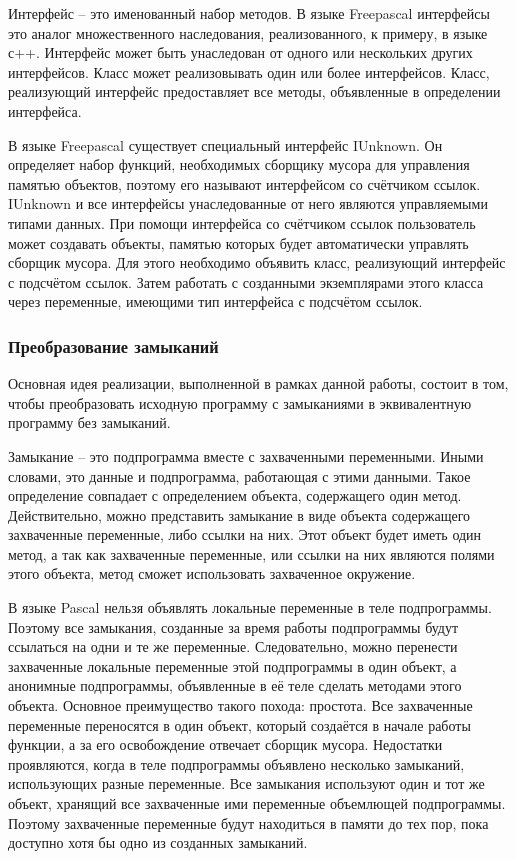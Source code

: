 \documentclass{imcs}
\begin{document}
Интерфейс -- это именованный набор методов. В языке Freepascal интерфейсы это аналог множественного
наследования, реализованного, к примеру, в языке с++. Интерфейс может быть унаследован от одного или
нескольких других интерфейсов. Класс может реализовывать один или более интерфейсов.
Класс, реализующий интерфейс предоставляет все методы, объявленные в определении интерфейса\cite{refguide}.

В языке Freepascal существует специальный интерфейс IUnknown. Он определяет
набор функций, необходимых сборщику мусора для управления памятью объектов, поэтому его называют
интерфейсом со счётчиком ссылок. IUnknown и все
интерфейсы унаследованные от него являются управляемыми типами данных.
При помощи интерфейса со счётчиком ссылок пользователь может создавать объекты,
памятью которых будет автоматически управлять сборщик мусора. Для этого необходимо
объявить класс, реализующий интерфейс с подсчётом ссылок. Затем работать с созданными
экземплярами этого класса через переменные, имеющими тип интерфейса с подсчётом ссылок.

\subsubsection{Преобразование замыканий}

Основная идея реализации, выполненной в рамках данной работы, состоит в том, чтобы преобразовать
исходную программу с замыканиями в эквивалентную программу без замыканий.

Замыкание -- это подпрограмма вместе с захваченными переменными. Иными словами, это данные и подпрограмма,
работающая с этими данными. Такое определение совпадает с определением объекта, содержащего один метод.
Действительно, можно представить замыкание в виде объекта содержащего захваченные переменные,
либо ссылки на них. Этот объект будет иметь один метод, а так как захваченные переменные, или ссылки на них
являются полями этого объекта, метод сможет использовать захваченное окружение.

В языке Pascal нельзя объявлять локальные переменные в теле подпрограммы. Поэтому все замыкания, созданные
за время работы подпрограммы будут ссылаться на одни и те же переменные. Следовательно, можно перенести
захваченные локальные переменные этой подпрограммы в один объект, а анонимные подпрограммы, объявленные в её теле
сделать методами этого объекта. Основное преимущество такого похода: простота. Все захваченные переменные
переносятся в один объект, который создаётся в начале работы функции, а за его освобождение отвечает сборщик
мусора. Недостатки проявляются, когда в теле подпрограммы объявлено несколько замыканий, использующих разные
переменные. Все замыкания используют один и тот же объект, хранящий все захваченные ими переменные объемлющей
подпрограммы. Поэтому захваченные переменные будут находиться в памяти до тех пор, пока доступно хотя бы 
одно из созданных замыканий.
\end{document}
